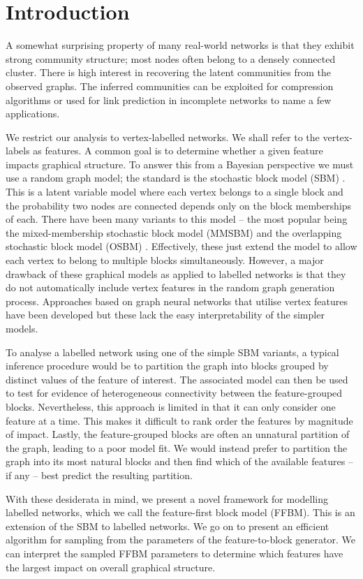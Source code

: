 \section{Introduction}

A somewhat surprising property of many real-world networks is that they exhibit strong community structure; most nodes often belong to a densely connected cluster. There is high interest in recovering the latent communities from the observed graphs. The inferred communities can be exploited for compression algorithms \cite{cluster-compression} or used for link prediction in incomplete networks \cite{link-prediction} to name a few applications.

We restrict our analysis to vertex-labelled networks. We shall refer to the vertex-labels as features. A common goal is to determine whether a given feature impacts graphical structure. To answer this from a Bayesian perspective we must use a random graph model; the standard is the stochastic block model (SBM) \cite{vanilla-sbm}. This is a latent variable model where each vertex belongs to a single block and the probability two nodes are connected depends only on the block memberships of each. There have been many variants to this model -- the most popular being the mixed-membership stochastic block model (MMSBM) \cite{mixed-membership-sbm} and the overlapping stochastic block model (OSBM) \cite{overlapping-sbm}. Effectively, these just extend the model to allow each vertex to belong to multiple blocks simultaneously. However, a major drawback of these graphical models as applied to labelled networks is that they do not automatically include vertex features in the random graph generation process. Approaches based on graph neural networks \cite{sbm-gnn} that utilise vertex features have been developed but these lack the easy interpretability of the simpler models.

To analyse a labelled network using one of the simple SBM variants, a typical inference procedure would be to partition the graph into blocks grouped by distinct values of the feature of interest. The associated model can then be used to test for evidence of heterogeneous connectivity between the feature-grouped blocks. Nevertheless, this approach is limited in that it can only consider one feature at a time. This makes it difficult to rank order the features by  magnitude of impact. Lastly, the feature-grouped blocks are often an unnatural partition of the graph, leading to a poor model fit. We would instead prefer to partition the graph into its most natural blocks and then find which of the available features -- if any -- best predict the resulting partition.

With these desiderata in mind, we present a novel framework for modelling labelled networks, which we call the feature-first block model (FFBM). This is an extension of the SBM to labelled networks. We go on to present an efficient algorithm for sampling from the parameters of the feature-to-block generator. We can interpret the sampled FFBM parameters to determine which features have the largest impact on overall graphical structure.